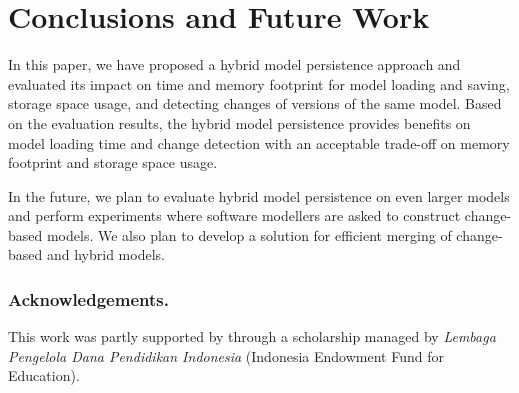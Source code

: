 \documentclass{llncs}
\begin{document}
\section{Conclusions and Future Work}
\label{sec:conlcusions_and_future_work}
In this paper, we have proposed a hybrid model persistence approach and evaluated its impact on time and memory footprint for model loading and saving, storage space usage, and detecting changes of versions of the same model. Based on the evaluation results, the hybrid model persistence provides benefits on model loading time and change detection with an acceptable trade-off on memory footprint and storage space usage.

In the future, we plan to evaluate hybrid model persistence on even larger models and perform experiments where software modellers are asked to construct change-based models. We also plan to develop a solution for efficient merging of change-based and hybrid models. 

\subsubsection*{Acknowledgements.} This work was partly supported by through a scholarship managed by \emph{Lembaga Pengelola Dana Pendidikan Indonesia} (Indonesia Endowment Fund for Education).
 

\end{document}
